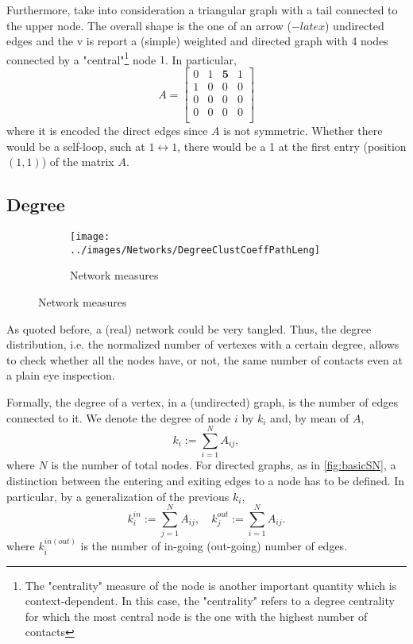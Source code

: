 \documentclass[a4paper,10pt, oneside]{book} %
\theoremstyle{definition}
\begin{document}
Furthermore, take into consideration a triangular graph with a tail connected to the upper node. The overall shape is the one of an arrow ($-latex$) undirected edges and the v is report a (simple) weighted and directed graph with 4 nodes connected by a "central"\footnote{The "centrality" measure of the node is another important quantity which is context-dependent. In this case, the "centrality" refers to a degree centrality for which the most central node is the one with the highest number of contacts} node $1$.
In particular,
\[
A = 
\begin{bmatrix}
0 & 1 & \textbf{5} & 1 \\
1 & 0 & 0 & 0 \\
0 & 0 & 0 & 0 \\
0 & 0 & 0 & 0 \\ 
\end{bmatrix}
\]
where it is encoded the direct edges since $A$ is not symmetric. Whether there would be a self-loop, such at $ 1 \longleftrightarrow 1 $, there would be a 1 at the first entry (position $(1,1)$) of the matrix $A$.

\subsection{Degree}

\begin{figure}[ht]
    \begin{subfigure}{\textwidth}
        \texttt{[image: ../images/Networks/DegreeClustCoeffPathLeng]}
        \centering
        \caption{Network measures \cite{Olaf:2011_NonRandomBrain}}
        \label{fig:degree_clustcoefficient_pathlength}
    \end{subfigure}
\end{figure}
As quoted before, a (real) network could be very tangled. Thus, the degree distribution, i.e. the normalized number of vertexes with a certain degree, allows to check whether all the nodes have, or not, the same number of contacts even at a plain eye inspection. 

Formally, the degree of a vertex, in a (undirected) graph, is the number of edges connected to it. We denote the degree of node $i$ by $k_i$ and, by mean of $A$, $$k_i := \sum_{i=1}^{N} A_{ij},$$ where $N$ is the number of total nodes.
For directed graphs, as in \autoref{fig:basicSN}, a distinction between the entering and exiting edges to a node has to be defined. In particular, by a generalization of the previous $k_i$, 
\begin{equation}
	k_i^{in} := \sum_{j=1}^N A_{ij}, \quad k_j^{out} := \sum_{i=1}^N A_{ij}.
	\label{eq:kin_kout}	
\end{equation}
where $k_i^{in(out)}$ is the number of in-going (out-going) number of edges. 
\end{document}
